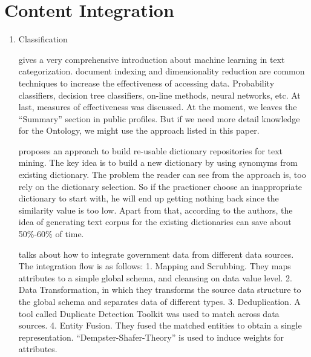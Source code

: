 \section{Content Integration}
\begin{enumerate}
\item Classification

\cite{sebastiani2002} gives a very comprehensive introduction about machine learning in text categorization. document indexing and dimensionality reduction are common techniques to increase the effectiveness of accessing data. Probability classifiers, decision tree classifiers, on-line methods, neural networks, etc. At last, measures of effectiveness was discussed. At the moment, we leaves the ``Summary'' section in public profiles. But if we need more detail knowledge for the Ontology, we might use the approach listed in this paper.

\cite{godbole2010} proposes an approach to build re-usable dictionary repositories for text mining. The key idea is to build a new dictionary by using synomyms from existing dictionary. The problem the reader can see from the approach is, too rely on the dictionary selection. So if the practioner choose an inappropriate dictionary to start with, he will end up getting nothing back since the similarity value is too low. Apart from that, according to the authors, the idea of generating text corpus for the existing dictionaries can save about 50\%-60\% of time.

\cite{bohm2010} talks about how to integrate government data from different data sources. The integration flow is as follows: 1. Mapping and Scrubbing. They maps attributes to a simple global schema, and cleansing on data value level. 2. Data Transformation, in which they transforms the source data structure to the global schema and separates data of different types. 3. Deduplication. A tool called Duplicate Detection Toolkit was used to match across data sources. 4. Entity Fusion. They fused the matched entities to obtain a single representation. ``Dempster-Shafer-Theory'' is used to induce weights for attributes.

\end{enumerate}

